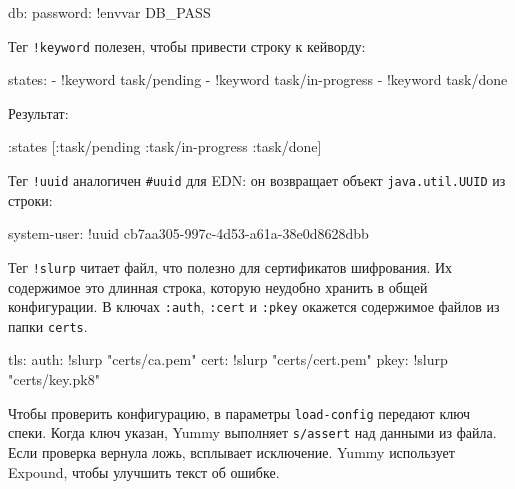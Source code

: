 
\begin{english}
  \begin{yaml}
db:
  password: !envvar DB_PASS
  \end{yaml}
\end{english}

\noindent
Тег \verb|!keyword| полезен, чтобы привести строку к кейворду:

\begin{english}
  \begin{yaml}
states:
  - !keyword task/pending
  - !keyword task/in-progress
  - !keyword task/done
  \end{yaml}
\end{english}

\noindent
Результат:

\begin{english}
  \begin{clojure}
{:states [:task/pending :task/in-progress :task/done]}
  \end{clojure}
\end{english}

Тег \verb|!uuid| аналогичен \verb|#uuid| для EDN: он возвращает объект
\verb|java.util.UUID| из строки:

\begin{english}
  \begin{yaml}
system-user: !uuid cb7aa305-997c-4d53-a61a-38e0d8628dbb
  \end{yaml}
\end{english}

Тег \verb|!slurp| читает файл, что полезно для сертификатов шифрования. Их
содержимое это длинная строка, которую неудобно хранить в общей конфигурации. В
ключах \verb|:auth|, \verb|:cert| и \verb|:pkey| окажется содержимое
файлов из папки \verb|certs|.

\begin{english}
  \begin{yaml}
tls:
  auth: !slurp "certs/ca.pem"
  cert: !slurp "certs/cert.pem"
  pkey: !slurp "certs/key.pk8"
  \end{yaml}
\end{english}


Чтобы проверить конфигурацию, в параметры \verb|load-config| передают ключ
спеки. Когда ключ указан, Yummy выполняет \verb|s/assert| над данными из
файла. Если проверка вернула ложь, всплывает исключение. Yummy использует
Expound, чтобы улучшить текст об ошибке.

